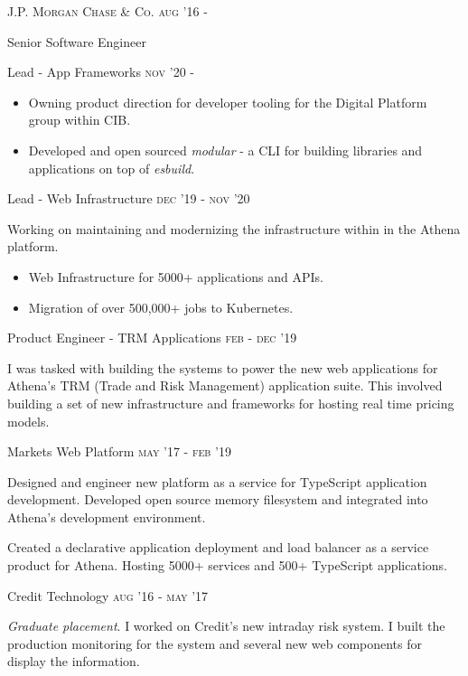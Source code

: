 
\textsc{\small{J.P. Morgan Chase \& Co. }}
\hfill
\textsc{\small{\raggedleft aug '16 -}}

{\Large Senior Software Engineer}

\vspace{5pt}

{\large Lead - App Frameworks}
\hfill
\textsc{\small{\raggedleft nov '20 - }}

\begin{itemize}
	\item Owning product direction for developer tooling for the Digital Platform group within CIB.
	\item Developed and open sourced \textit{modular} - a CLI for building libraries and applications on top of \textit{esbuild}.
\end{itemize}

{\large Lead - Web Infrastructure}
\hfill
\textsc{\small{\raggedleft dec '19 - nov '20 }}

Working on maintaining and modernizing the infrastructure within in the Athena platform.

\begin{itemize}
	\item Web Infrastructure for 5000+ applications and APIs.
	\item Migration of over 500,000+ jobs to Kubernetes.
\end{itemize}

\vspace{8pt}

{\large Product Engineer - TRM Applications}
\hfill
\textsc{\small{\raggedleft feb - dec '19}}

I was tasked with building the systems to power the new web applications for Athena's TRM (Trade and Risk Management) application suite. This involved building a set of new infrastructure and frameworks for hosting real time pricing models. 

\vspace{8pt}

{\large Markets Web Platform}
\hfill
\textsc{\small{\raggedleft may '17 - feb '19}}

Designed and engineer new platform as a service for TypeScript application development. Developed open source memory filesystem and  integrated into Athena's development environment. 

Created a declarative application deployment and load balancer as a service product for Athena. Hosting 5000+ services and 500+ TypeScript applications.

\vspace{8pt}

{\large Credit Technology}
\hfill
\textsc{\small{\raggedleft aug '16 - may '17}}

\textit{Graduate placement}. I worked on Credit's new intraday risk system. I built the production monitoring for the system and several new web components for display the information. 